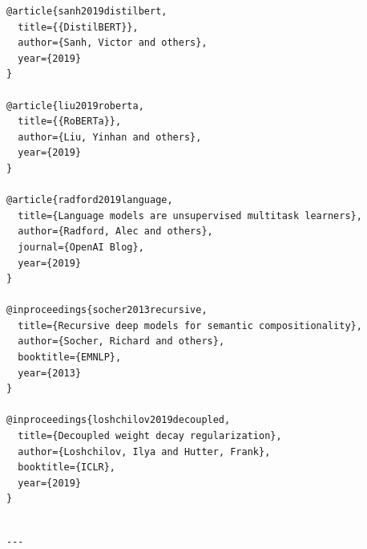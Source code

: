\begin{lstlisting}
@article{sanh2019distilbert,
  title={{DistilBERT}},
  author={Sanh, Victor and others},
  year={2019}
}

@article{liu2019roberta,
  title={{RoBERTa}},
  author={Liu, Yinhan and others},
  year={2019}
}

@article{radford2019language,
  title={Language models are unsupervised multitask learners},
  author={Radford, Alec and others},
  journal={OpenAI Blog},
  year={2019}
}

@inproceedings{socher2013recursive,
  title={Recursive deep models for semantic compositionality},
  author={Socher, Richard and others},
  booktitle={EMNLP},
  year={2013}
}

@inproceedings{loshchilov2019decoupled,
  title={Decoupled weight decay regularization},
  author={Loshchilov, Ilya and Hutter, Frank},
  booktitle={ICLR},
  year={2019}
}
\end{lstlisting}
\begin{lstlisting}

---
\end{lstlisting}
